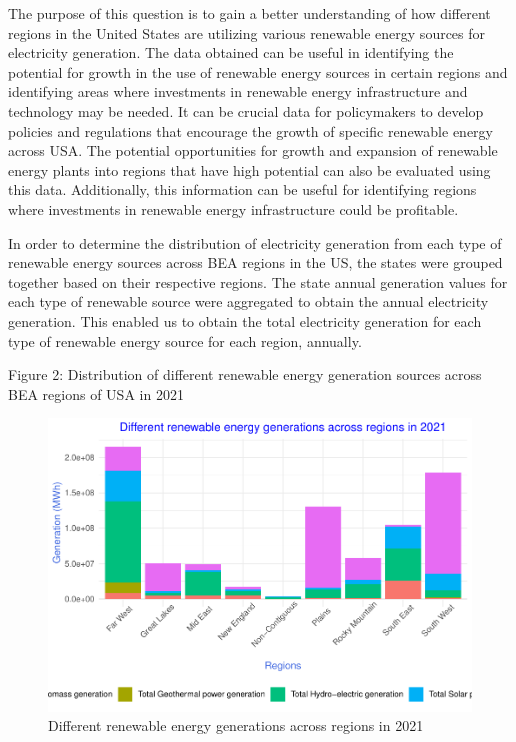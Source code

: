 \documentclass[
]{article}
\begin{document}
The purpose of this question is to gain a better understanding of how
different regions in the United States are utilizing various renewable
energy sources for electricity generation. The data obtained can be
useful in identifying the potential for growth in the use of renewable
energy sources in certain regions and identifying areas where
investments in renewable energy infrastructure and technology may be
needed. It can be crucial data for policymakers to develop policies and
regulations that encourage the growth of specific renewable energy
across USA. The potential opportunities for growth and expansion of
renewable energy plants into regions that have high potential can also
be evaluated using this data. Additionally, this information can be
useful for identifying regions where investments in renewable energy
infrastructure could be profitable.

In order to determine the distribution of electricity generation from
each type of renewable energy sources across BEA regions in the US, the
states were grouped together based on their respective regions. The
state annual generation values for each type of renewable source were
aggregated to obtain the annual electricity generation. This enabled us
to obtain the total electricity generation for each type of renewable
energy source for each region, annually.

Figure 2: Distribution of different renewable energy generation sources
across BEA regions of USA in 2021

\begin{figure}

{\centering \includegraphics{EDA_Project_Mutha_Kry_Ghosh_VS_files/figure-latex/Q2plot-1} 

}

\caption{Different renewable energy generations across regions in 2021}\label{fig:Q2plot}
\end{figure}
\end{document}
